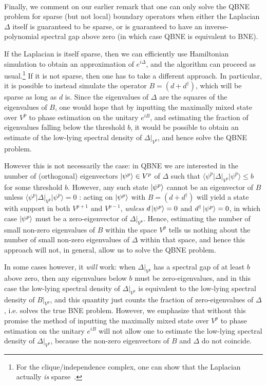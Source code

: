 \documentclass[11pt]{article}
\numberwithin{equation}{section}
\renewcommand\( {\left(}
\renewcommand\) {\right)}
\renewcommand{\braket}[1]{\langle #1 \rangle}
\begin{document}
\ 

\noindent Finally, we comment on our earlier remark that one can only solve the {\sc QBNE} problem for sparse (but not local) boundary operators when either the Laplacian $\Delta$ itself is guaranteed to be sparse, or is guaranteed to have an inverse-polynomial spectral gap above zero (in which case {\sc QBNE} is equivalent to {\sc BNE}). 

If the Laplacian is itself sparse, then we can efficiently use Hamiltonian simulation to obtain an approximation of $e^{i\Delta}$, and the algorithm can proceed as usual.\footnote{For the clique/independence complex, one can show that the Laplacian actually \emph{is} sparse~\cite{gyurik}.} If it is not sparse, then one has to take a different approach. In particular, it is possible to instead simulate the operator $B = (d + d^\dagger)$, which will be sparse as long as $d$ is. Since the eigenvalues of $\Delta$ are the squares of the eigenvalues of $B$, one would hope that by inputting the maximally mixed state over $V^p$ to phase estimation on the unitary $e^{iB}$, and estimating the fraction of eigenvalues falling below the threshold $b$, it would be possible to obtain an estimate of the low-lying spectral density of $\Delta|_{V^p}$, and hence solve the {\sc QBNE} problem. 

However this is not necessarily the case: in {\sc QBNE} we are interested in the number of (orthogonal) eigenvectors $\ket{\psi^p} \in V^p$ of $\Delta$ such that $\braket{\psi^p | \Delta|_{V^p} | \psi^p} \leq b$ for some threshold $b$. However, any such state $\ket{\psi^p}$ cannot be an eigenvector of $B$ unless $\braket{\psi^p | \Delta|_{V^p} | \psi^p} = 0$ : acting on $\ket{\psi^p}$ with $B = (d + d^\dagger)$ will yield a state with support in both $V^{p+1}$ and $V^{p-1}$, \emph{unless} $d\ket{\psi^p} = 0$ and $d^\dagger\ket{\psi^p} = 0$, in which case $\ket{\psi^p}$ must be a zero-eigenvector of $\Delta|_{V^p}$. Hence, estimating the number of small non-zero eigenvalues of $B$ within the space $V^p$ tells us nothing about the number of small non-zero eigenvalues of $\Delta$ within that space, and hence this approach will not, in general, allow us to solve the {\sc QBNE} problem. 

In some cases however, it \emph{will} work: when $\Delta|_{V^p}$ has a spectral gap of at least $b$ above zero, then any eigenvalues below $b$ must be zero-eigenvalues, and in this case the low-lying spectral density of $\Delta|_{V^p}$ is equivalent to the low-lying spectral density of $B|_{V^p}$, and this quantity just counts the fraction of zero-eigenvalues of $\Delta$, i.e. solves the true {\sc BNE} problem. However, we emphasize that without this promise the method of inputting the maximally mixed state over $V^p$ to phase estimation on the unitary $e^{iB}$ will not allow one to estimate the low-lying spectral density of $\Delta|_{V^p}$, because the non-zero eigenvectors of $B$ and $\Delta$ do not coincide. 
\end{document}
